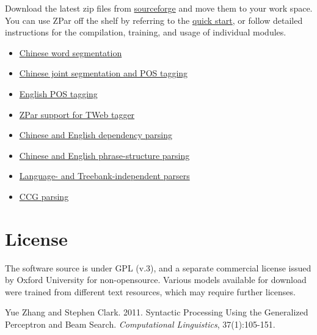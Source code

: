 \documentclass[12pt]{article}
\begin{document}
Download the latest zip files from \href{http://sourceforge.net/projects/zpar/}{sourceforge} and move them to your work space.
\\
You can use ZPar off the shelf by referring to the \href{doc/qs.html}{quick start}, or follow detailed instructions for the compilation, training, and usage of individual modules.
\begin{itemize}
\item \href{doc/segmentor.html}{Chinese word segmentation}
\item \href{doc/joint_seg_tag.html}{Chinese joint segmentation and POS tagging}
\item \href{doc/eng_tagger.html}{English POS tagging}
\item \href{doc/tweb_tagger.html}{ZPar support for TWeb tagger}
\item \href{doc/deppar.html}{Chinese and English dependency parsing}
\item  \href{doc/conparser.html}{Chinese and English phrase-structure parsing}
\item \href{doc/independent.html}{Language- and Treebank-independent parsers}
\item \href{doc/ccg.html}{CCG parsing}
\end{itemize}

\section{License}

The software source is under GPL (v.3), and a separate commercial license
issued by Oxford University for non-opensource. Various models available for
download were trained from different text resources, which may require further
licenses.

\begin{thebibliography}{99}
Yue Zhang and Stephen Clark. 2011. Syntactic Processing Using the Generalized Perceptron and Beam Search. \textit{Computational Linguistics}, 37(1):105-151.
\end{thebibliography}
\end{document}
